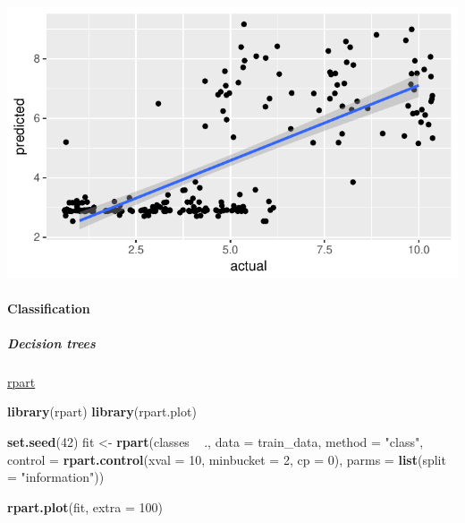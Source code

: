 \documentclass[]{article}
\newenvironment{Shaded}{\begin{snugshade}}{\end{snugshade}}
\newcommand{\KeywordTok}[1]{\textcolor[rgb]{0.13,0.29,0.53}{\textbf{{#1}}}}
\newcommand{\DataTypeTok}[1]{\textcolor[rgb]{0.13,0.29,0.53}{{#1}}}
\newcommand{\DecValTok}[1]{\textcolor[rgb]{0.00,0.00,0.81}{{#1}}}
\newcommand{\StringTok}[1]{\textcolor[rgb]{0.31,0.60,0.02}{{#1}}}
\newcommand{\NormalTok}[1]{{#1}}
\let\oldparagraph\paragraph
\renewcommand{\paragraph}[1]{\oldparagraph{#1}\mbox{}}
\let\oldsubparagraph\subparagraph
\renewcommand{\subparagraph}[1]{\oldsubparagraph{#1}\mbox{}}
\begin{document}
\includegraphics{webinar_code_files/figure-latex/regression_result-1.pdf}

\paragraph{Classification}\label{classification}

\subparagraph{Decision trees}\label{decision-trees}

\href{https://cran.r-project.org/web/packages/rpart/rpart.pdf}{rpart}

\begin{Shaded}
\begin{Highlighting}[]
\KeywordTok{library}\NormalTok{(rpart)}
\KeywordTok{library}\NormalTok{(rpart.plot)}

\KeywordTok{set.seed}\NormalTok{(}\DecValTok{42}\NormalTok{)}
\NormalTok{fit <-}\StringTok{ }\KeywordTok{rpart}\NormalTok{(classes ~}\StringTok{ }\NormalTok{.,}
            \DataTypeTok{data =} \NormalTok{train_data,}
            \DataTypeTok{method =} \StringTok{"class"}\NormalTok{,}
            \DataTypeTok{control =} \KeywordTok{rpart.control}\NormalTok{(}\DataTypeTok{xval =} \DecValTok{10}\NormalTok{, }
                                    \DataTypeTok{minbucket =} \DecValTok{2}\NormalTok{, }
                                    \DataTypeTok{cp =} \DecValTok{0}\NormalTok{), }
             \DataTypeTok{parms =} \KeywordTok{list}\NormalTok{(}\DataTypeTok{split =} \StringTok{"information"}\NormalTok{))}

\KeywordTok{rpart.plot}\NormalTok{(fit, }\DataTypeTok{extra =} \DecValTok{100}\NormalTok{)}
\end{Highlighting}
\end{Shaded}
\end{document}
